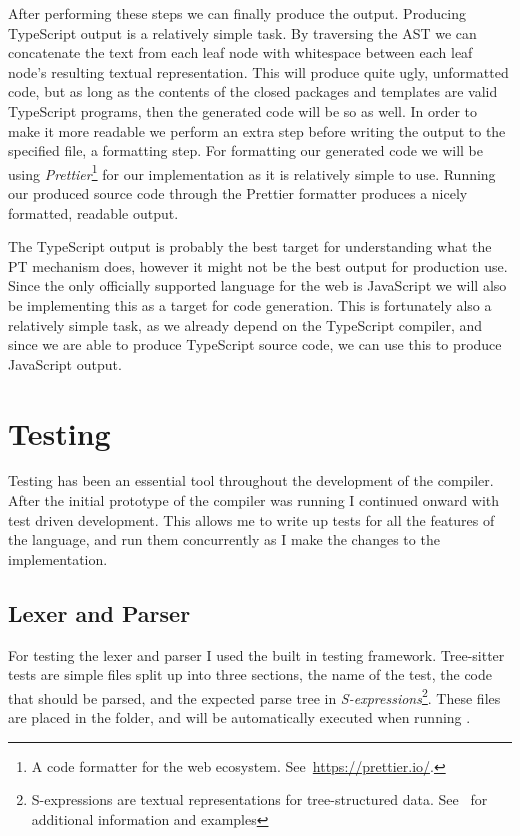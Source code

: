 After performing these steps we can finally produce the output.
Producing TypeScript output is a relatively simple task.
By traversing the AST we can concatenate the text from each leaf node with whitespace between each leaf node's resulting textual representation.
This will produce quite ugly, unformatted code, but as long as the contents of the closed packages and templates are valid TypeScript programs, then the generated code will be so as well.
In order to make it more readable we perform an extra step before writing the output to the specified file, a formatting step.
For formatting our generated code we will be using \textit{Prettier}\footnote{A code formatter for the web ecosystem. See~\url{https://prettier.io/}.} for our implementation as it is relatively simple to use.
Running our produced source code through the Prettier formatter produces a nicely formatted, readable output.

The TypeScript output is probably the best target for understanding what the PT mechanism does, however it might not be the best output for production use.
Since the only officially supported language for the web is JavaScript we will also be implementing this as a target for code generation.
This is fortunately also a relatively simple task, as we already depend on the TypeScript compiler, and since we are able to produce TypeScript source code, we can use this to produce JavaScript output.

\section{Testing}\label{sec:testing}

Testing has been an essential tool throughout the development of the compiler.
After the initial prototype of the compiler was running I continued onward with test driven development.
This allows me to write up tests for all the features of the language, and run them concurrently as I make the changes to the implementation.

\subsection{Lexer and Parser}\label{subsec:testing-lexer-and-parser}

For testing the lexer and parser I used the built in testing framework.
Tree-sitter tests are simple  files split up into three sections, the name of the test, the code that should be parsed, and the expected parse tree in \textit{S-expressions}\footnote{S-expressions are textual representations for tree-structured data. See~\cite{sexprs} for additional information and examples}.
These files are placed in the  folder, and will be automatically executed when running .

